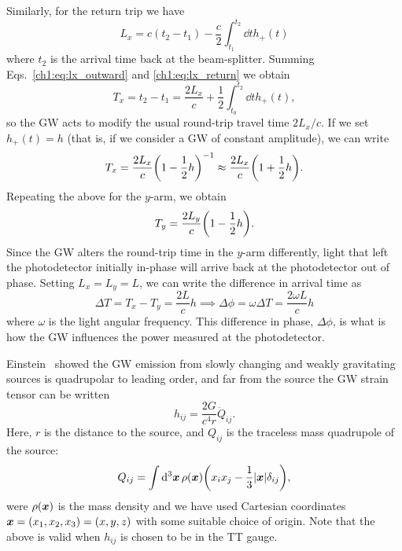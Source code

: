 Similarly, for the return trip we have
\begin{equation}\label{ch1:eq:lx_return}
    L_x = c(t_2 - t_1) - \frac{c}{2} \int_{t_1}^{t_2} \dd{t} h_+(t)
\end{equation}
where $t_2$ is the arrival time back at the beam-splitter.
Summing Eqs.~\ref{ch1:eq:lx_outward} and \ref{ch1:eq:lx_return} we obtain
\begin{equation}
    T_x = t_2 - t_1 = \frac{2L_x}{c} + \frac{1}{2}\int_{t_0}^{t_2} \dd{t} h_+(t),
\end{equation}
so the GW acts to modify the usual round-trip travel time $2L_x/c$.
If we set $h_+(t) = h$ (that is, if we consider a GW of constant amplitude), we can write
\begin{equation}
    T_x = \frac{2L_x}{c}\qty(1-\frac{1}{2}h)^{-1} \approx \frac{2L_x}{c}\qty(1+\frac{1}{2}h).
\end{equation}
Repeating the above for the $y$-arm, we obtain
\begin{equation}
    T_y = \frac{2L_y}{c}\qty(1-\frac{1}{2}h).
\end{equation}
Since the GW alters the round-trip time in the $y$-arm differently, light that left the photodetector initially in-phase will arrive back at the photodetector out of phase.
Setting $L_x = L_y = L$, we can write the difference in arrival time as
\begin{equation}
    \Delta T = T_x - T_y = \frac{2L}{c}h \implies \Delta \phi = \omega \Delta T = \frac{2\omega L}{c}h
\end{equation}
where $\omega$ is the light angular frequency. 
This difference in phase, $\Delta\phi$, is what is how the GW influences the power measured at the photodetector. 

Einstein~\cite{Einstein:1918btx} showed the GW emission from slowly changing and weakly gravitating sources is quadrupolar to leading order, and far from the source the GW strain tensor can be written
\begin{equation}\label{ch1:eq:quadrupole_strain}
    h_{ij} = \frac{2G}{c^4 r}\ddot{Q}_{ij}.
\end{equation}
Here, $r$ is the distance to the source, and $Q_{ij}$ is the traceless mass quadrupole of the source:
\begin{equation}\label{ch1:eq:quadrupole}
    Q_{ij} = \int \dd[3]{\vb*{x}} \rho(\vb*{x}) \qty(x_i x_j - \frac{1}{3} \abs{\vb*{x}} \delta_{ij}),
\end{equation}
were $\rho(\vb*{x})$ is the mass density and we have used Cartesian coordinates $\vb*{x} = (x_1, x_2, x_3) = (x,y,z)$ with some suitable choice of origin.
Note that the above is valid when $h_{ij}$ is chosen to be in the TT gauge.

